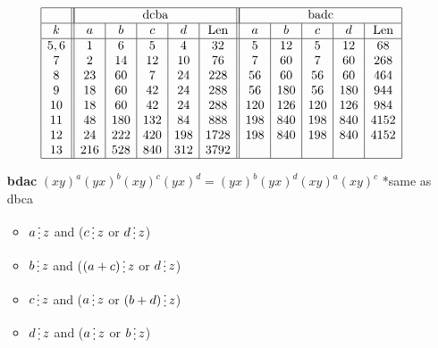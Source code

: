 \documentclass[utf8]{article}
\newcommand{\divisibleby}{\mathop{\raisebox{-2pt}{\vdots}}}
\begin{document}
\begin{itemize}
		~
		\begin{table}[!htb]
			\arraycolsep=2pt
			$$
			\begin{array}{|c||c|c|c|c|c||c|c|c|c|c|}
			\hline
			&\multicolumn{5}{|c||}{\text{dcba}}&\multicolumn{5}{|c|}{\text{badc}}\\
			\hline
			k&a&b&c&d&\text{Len}&a&b&c&d&\text{Len}\\
			\hline
			5,6&1&6&5&4&32&5&12&5&12&68\\
			7&2&14&12&10&76&7&60&7&60&268\\
			8&23&60&7&24&228&56&60&56&60&464\\
			9&18&60&42&24&288&56&180&56&180&944\\
			10&18&60&42&24&288&120&126&120&126&984\\
			11&48&180&132&84&888&198&840&198&840&4152\\
			12&24&222&420&198&1728&198&840&198&840&4152\\
			13&216&528&840&312&3792&&&&&\\
			\hline
			\end{array}
			$$
		\end{table}
		
		\item[\textbf{bdac}] $(xy)^a(yx)^b(xy)^c(yx)^d = (yx)^b(yx)^d(xy)^a(xy)^c$  *same as dbca 
		\begin{itemize}
			\item $a \divisibleby z$ and ($c \divisibleby z$ or $d \divisibleby z$)
			\item $b \divisibleby z$ and ($(a+c) \divisibleby z$ or $d \divisibleby z$)
			\item $c \divisibleby z$ and ($a \divisibleby z$ or $(b+d) \divisibleby z$)
			\item $d \divisibleby z$ and ($a \divisibleby z$ or $b \divisibleby z$)
		\end{itemize}
	\end{itemize}
	
	
\end{document}

